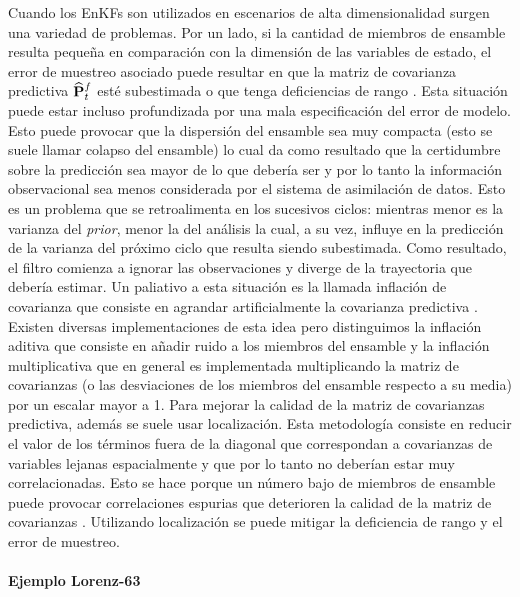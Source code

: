 Cuando los EnKFs son utilizados en escenarios de alta dimensionalidad surgen una variedad de problemas. Por un lado, si la cantidad de miembros de ensamble resulta pequeña en comparación con la dimensión de las variables de estado, el error de muestreo asociado puede resultar en que la matriz de covarianza predictiva $\widehat{\mathbf{P}}_t^f$ esté subestimada o que tenga deficiencias de rango \citep{Miyoshi2011}. Esta situación puede estar incluso profundizada por una mala especificación del error de modelo. Esto puede provocar que la dispersión del ensamble sea muy compacta (esto se suele llamar colapso del ensamble) lo cual da como resultado que la certidumbre sobre la predicción sea mayor de lo que debería ser y por lo tanto la información observacional sea menos considerada por el sistema de asimilación de datos. Esto es un problema que se retroalimenta en los sucesivos ciclos: mientras menor es la varianza del \textit{prior}, menor la del análisis la cual, a su vez, influye en la predicción de la varianza del próximo ciclo que resulta siendo subestimada. Como resultado, el filtro comienza a ignorar las observaciones y diverge de la trayectoria que debería estimar. Un paliativo a esta situación es la llamada inflación de covarianza que consiste en agrandar artificialmente la covarianza predictiva \citep{Anderson1999}. Existen diversas implementaciones de esta idea pero distinguimos la inflación aditiva que consiste en añadir ruido a los miembros del ensamble y la inflación multiplicativa que en general es implementada multiplicando la matriz de covarianzas (o las desviaciones de los miembros del ensamble respecto a su media) por un escalar mayor a 1. Para mejorar la calidad de la matriz de covarianzas predictiva, además se suele usar localización. Esta metodología consiste en reducir el valor de los términos fuera de la diagonal que correspondan a covarianzas de variables lejanas espacialmente y que por lo tanto no deberían estar muy correlacionadas. Esto se hace porque un número bajo de miembros de ensamble puede provocar correlaciones espurias que deterioren la calidad de la matriz de covarianzas \citep{Hamill2001}. Utilizando localización se puede mitigar la deficiencia de rango y el error de muestreo. 

\paragraph{Ejemplo Lorenz-63}

